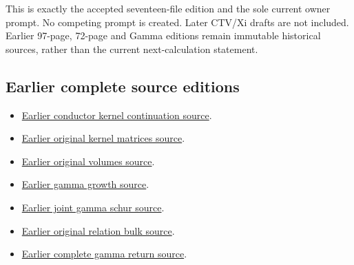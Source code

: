 \documentclass[
]{article}
\providecommand{\tightlist}{%
  \setlength{\itemsep}{0pt}\setlength{\parskip}{0pt}}
\begin{document}
This is exactly the accepted seventeen-file edition and the sole current
owner prompt. No competing prompt is created. Later CTV/Xi drafts are
not included. Earlier 97-page, 72-page and Gamma editions remain
immutable historical sources, rather than the current next-calculation
statement.

\subsection{Earlier complete source
editions}\label{earlier-complete-source-editions-2}

\begin{itemize}
\tightlist
\item
  \href{https://github.com/KokunoYumeto/zeta-function-research-reader/tree/41adc412ceb119ad9086b1f106e377f3de2d401a/workbenches/splitzero-tandem/continuations/20260914-conductor-kernel-continuation}{Earlier
  conductor kernel continuation source}.
\item
  \href{https://github.com/KokunoYumeto/zeta-function-research-reader/tree/5817ef9027257375b6ff3de7048b3331077251e7/workbenches/splitzero-tandem/continuations/20260914-original-kernel-matrices}{Earlier
  original kernel matrices source}.
\item
  \href{https://github.com/KokunoYumeto/zeta-function-research-reader/tree/1c8ec52c85c173adc9f8403a8a26914955e2f5a9/workbenches/splitzero-tandem/continuations/20260914-original-volumes}{Earlier
  original volumes source}.
\item
  \href{https://github.com/KokunoYumeto/zeta-function-research-reader/tree/41f020e0475429943252e69a1b4edd849393c780/workbenches/splitzero-tandem/continuations/20260914-gamma-growth}{Earlier
  gamma growth source}.
\item
  \href{https://github.com/KokunoYumeto/zeta-function-research-reader/tree/2be3b23974bf040f4ea06240b8a4b85372f7c71d/workbenches/splitzero-tandem/continuations/20260914-joint-gamma-schur}{Earlier
  joint gamma schur source}.
\item
  \href{https://github.com/KokunoYumeto/zeta-function-research-reader/tree/01fc8820e3a3ea69afa22b8ab1b0b5ca61869456/workbenches/splitzero-tandem/continuations/20260914-original-relation-bulk}{Earlier
  original relation bulk source}.
\item
  \href{https://github.com/KokunoYumeto/zeta-function-research-reader/tree/01fc8820e3a3ea69afa22b8ab1b0b5ca61869456/workbenches/splitzero-tandem/continuations/20260914-complete-gamma-return}{Earlier
  complete gamma return source}.
\end{itemize}
\end{document}
